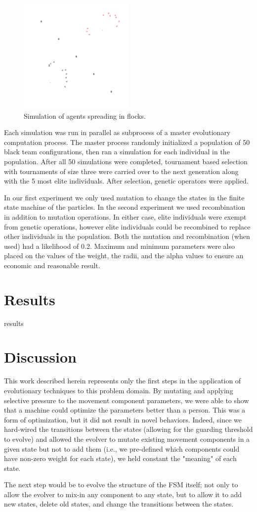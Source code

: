 \documentclass[12pt,journal,compsoc]{IEEEtran}
\begin{document}
\begin{figure}[h!]
    \centering
        \includegraphics[width=0.5\textwidth]{figures/simulation}
    \caption{Simulation of agents spreading in flocks.}
\end{figure}

Each simulation was run in parallel as subprocess of a master evolutionary computation process. The master process randomly initialized a population of 50 black team configurations, then ran a simulation for each individual in the population. After all 50 simulations were completed, tournament based selection with tournaments of size three were carried over to the next generation along with the 5 most elite individuals. After selection, genetic operators were applied.

In our first experiment we only used mutation to change the states in the finite state machine of the particles. In the second experiment we used recombination in addition to mutation operations. In either case, elite individuals were exempt from genetic operations, however elite individuals could be recombined to replace other individuals in the population. Both the mutation and recombination (when used) had a likelihood of 0.2. Maximum and minimum parameters were also placed on the values of the weight, the radii, and the alpha values to ensure an economic and reasonable result.

\section{Results}
results

\section{Discussion}
This work described herein represents only the first steps in the application of evolutionary techniques to this problem domain. By mutating and applying selective pressure to the movement component parameters, we were able to show that a machine could optimize the parameters better than a person. This was a form of optimization, but it did not result in novel behaviors. Indeed, since we hard-wired the transitions between the states (allowing for the guarding threshold to evolve) and allowed the evolver to mutate existing movement components in a given state but not to add them (i.e., we pre-defined which components could have non-zero weight for each state), we held constant the "meaning" of each state.

The next step would be to evolve the structure of the FSM itself; not only to allow the evolver to mix-in any component to any state, but to allow it to add new states, delete old states, and change the transitions between the states.



\end{document}
